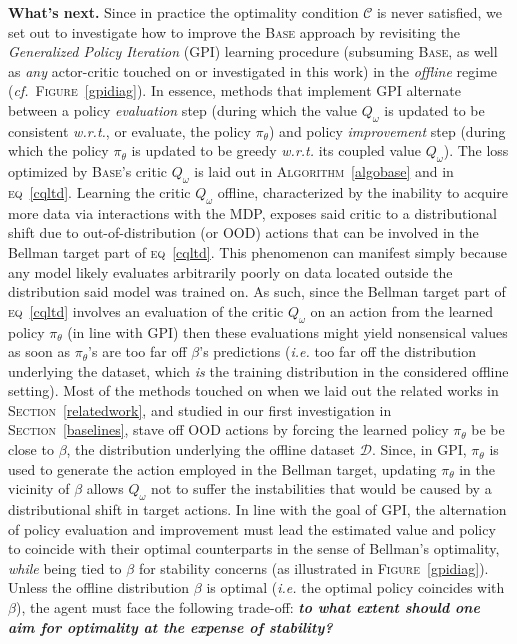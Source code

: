 \textbf{What's next.}
Since in practice the optimality condition $\mathcal{C}$ is never satisfied,
we set out to investigate how to improve the \textsc{Base} approach
by revisiting the
\emph{Generalized Policy Iteration} (GPI) learning procedure
(subsuming \textsc{Base}, as well as \emph{any} actor-critic touched on or investigated in this work)
in the \emph{offline} regime
(\textit{cf.}~\textsc{Figure}~\ref{gpidiag}).
In essence, methods that implement GPI alternate between a policy \emph{evaluation} step
(during which the value $Q_\omega$ is updated to be consistent \textit{w.r.t.}, or evaluate, the policy $\pi_\theta$)
and policy \emph{improvement} step
(during which the policy $\pi_\theta$ is updated to be greedy \textit{w.r.t.} its coupled value $Q_\omega$).
The loss optimized by \textsc{Base}'s critic $Q_\omega$ is laid out in \textsc{Algorithm}~\ref{algobase}
and in \textsc{eq}~\ref{cqltd}.
Learning the critic $Q_\omega$ offline,
characterized by the inability to acquire more data via interactions with the MDP,
exposes said critic to a distributional shift due to
out-of-distribution (or OOD) actions that can be involved in the Bellman target part of \textsc{eq}~\ref{cqltd}.
This phenomenon can manifest simply because any model likely evaluates arbitrarily poorly on
data located outside the distribution said model was trained on.
As such, since the Bellman target part of \textsc{eq}~\ref{cqltd}
involves an evaluation of the critic $Q_\omega$ on an action from the learned policy $\pi_\theta$ (in line with GPI)
then these evaluations might yield nonsensical values as soon as $\pi_\theta$'s are too far off
$\beta$'s predictions (\textit{i.e.} too far off the distribution underlying the dataset,
which \emph{is} the training distribution in the considered offline setting).
Most of the methods touched on when we laid out the related works in \textsc{Section}~\ref{relatedwork},
and studied in our first investigation in \textsc{Section}~\ref{baselines},
stave off OOD actions by forcing the learned policy $\pi_\theta$ be be close to $\beta$,
the distribution underlying the offline dataset $\mathcal{D}$.
Since, in GPI, $\pi_\theta$ is used to generate the action employed in the Bellman target,
updating $\pi_\theta$ in the vicinity of $\beta$ allows $Q_\omega$ not to suffer the instabilities
that would be caused by a distributional shift in target actions.
In line with the goal of GPI,
the alternation of policy evaluation and improvement must lead the estimated value and policy
to coincide with their optimal counterparts in the sense of Bellman's optimality,
\emph{while} being tied to $\beta$ for stability concerns
(as illustrated in \textsc{Figure}~\ref{gpidiag}).
Unless the offline distribution $\beta$ is optimal (\textit{i.e.} the optimal policy coincides with $\beta$),
the agent must face the following trade-off: \textbf{\emph{to what extent should one aim for optimality
at the expense of stability?}}

